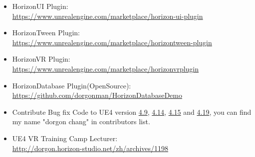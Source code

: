 \documentclass[a4paper,12pt]{memoir} %
\begin{document}

\newpage


\userinformation %

\framebreak %




{
  \begin{itemize}

    \item HorizonUI Plugin: \\
        \href{https://www.unrealengine.com/marketplace/horizon-ui-plugin}
             {https://www.unrealengine.com/marketplace/horizon-ui-plugin} \\
    \item HorizonTween Plugin: \\
        \href{https://www.unrealengine.com/marketplace/horizontween-plugin}
             {https://www.unrealengine.com/marketplace/horizontween-plugin} \\
    \item HorizonVR Plugin: \\
          \href{https://www.unrealengine.com/marketplace/horizonvrplugin}
               {https://www.unrealengine.com/marketplace/horizonvrplugin} \\

    \item HorizonDatabase Plugin(OpenSource): \\
          \href{https://github.com/dorgonman/HorizonDatabaseDemo}
              {https://github.com/dorgonman/HorizonDatabaseDemo}  \\
              
    \item Contribute Bug fix Code to UE4 version 
    \href{https://docs.unrealengine.com/latest/INT/Support/Builds/ReleaseNotes/2015/4_9/index.html}{4.9}, 
    \href{https://docs.unrealengine.com/latest/INT/Support/Builds/ReleaseNotes/2016/4_14/index.html}{4.14}, 
    \href{https://docs.unrealengine.com/latest/INT/Support/Builds/ReleaseNotes/4_15/}{4.15} and 
    \href{https://docs.unrealengine.com/latest/INT/Support/Builds/ReleaseNotes/4_19/}{4.19}, you can find my name "dorgon chang" in contributors list. \\

    \item UE4 VR Training Camp Lecturer: \\
      \href{http://dorgon.horizon-studio.net/zh/archives/1198}
          {http://dorgon.horizon-studio.net/zh/archives/1198}
  \end{itemize}

}
\end{document}
